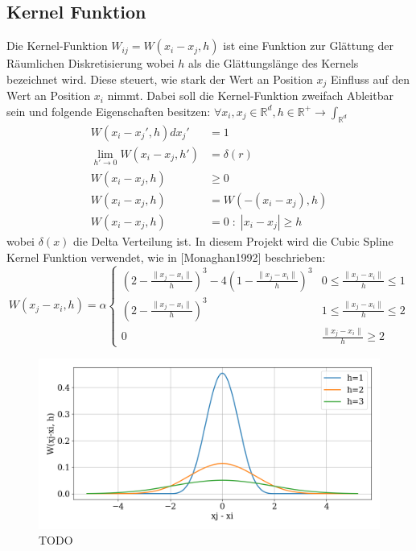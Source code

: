 \documentclass[a4paper, 12pt]{article}
\begin{document}
\subsection{Kernel Funktion}
Die Kernel-Funktion \(W_{ij} = W(x_i - x_j, h)\) ist eine Funktion zur Glättung der Räumlichen Diskretisierung wobei \(h\) als die Glättungslänge des Kernels bezeichnet wird. Diese steuert, wie stark der Wert an Position \(x_j\) Einfluss auf den Wert an Position \(x_i\) nimmt. Dabei soll die Kernel-Funktion zweifach Ableitbar sein und folgende Eigenschaften besitzen: \(\forall x_i, x_j \in \mathds{R}^d, h\in \mathds{R}^+ \rightarrow \int_{\mathds{R}^d}\)
\begin{align}
	W(x_i - x_j', h) dx_j' &= 1 \label{kernelEigenschaft1}\\
	\lim_{h'\rightarrow 0} W(x_i - x_j, h') &= \delta(r) \label{kernelEigenschaft2}\\
	W(x_i - x_j, h) &\geq 0 \label{kernelEigenschaft3}\\
	W(x_i - x_j, h) &= W(-(x_i - x_j), h) \label{kernelEigenschaft4}\\
	W(x_i - x_j, h) &= 0\;:\; |x_i - x_j| \geq h \label{kernelEigenschaft5}
\end{align}
wobei \(\delta(x)\) die Delta Verteilung ist. 
In diesem Projekt wird die Cubic Spline Kernel Funktion verwendet, wie in [Monaghan1992] beschrieben:
\begin{equation*}
	W(x_j - x_i, h) = \alpha \begin{cases} 
	(2-\frac{\|x_j - x_i\|}{h})^3 - 4(1-\frac{\|x_j - x_i\|}{h})^3 & 0 \leq \frac{\|x_j - x_i\|}{h} \leq 1\\
	(2-\frac{\|x_j - x_i\|}{h})^3 & 1 \leq \frac{\|x_j - x_i\|}{h} \leq 2 \\
	0 & \frac{\|x_j - x_i\|}{h} \geq 2 
	\end{cases}
\end{equation*}

\begin{figure}[H]
	\centering
	\includegraphics[width=\textwidth]{graphics/KernelPlot.png}
	\caption{TODO}
\end{figure}
\end{document}
